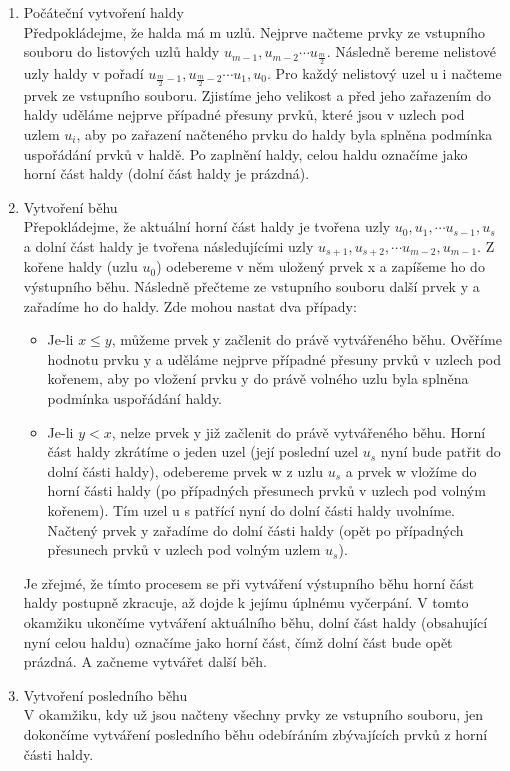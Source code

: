 \documentclass[10pt,a4paper]{article}
\begin{document}
\begin{enumerate}
	\item Počáteční vytvoření haldy \\
	Předpokládejme, že halda má m uzlů. Nejprve načteme prvky ze vstupního souboru do listových uzlů haldy $u_{m-1}, u_{m-2} \cdots u_{\frac{m}{2}}$. Následně bereme nelistové uzly haldy v pořadí $u_{\frac{m}{2}-1}, u_{\frac{m}{2}-2} \cdots u_1, u_0$. Pro každý nelistový uzel u i načteme prvek ze vstupního souboru. Zjistíme jeho velikost a před jeho zařazením do haldy uděláme nejprve případné přesuny prvků, které jsou v uzlech pod uzlem $u_i$, aby po zařazení načteného prvku do haldy byla splněna podmínka uspořádání prvků v haldě. Po zaplnění haldy, celou haldu označíme jako horní část haldy (dolní část haldy je prázdná).
	\item Vytvoření běhu \\
	Přepokládejme, že aktuální horní část haldy je tvořena uzly $u_0, u_1, \cdots u_{s-1}, u_s$ a dolní část haldy je tvořena následujícími uzly $u_{s+1}, u_{s+2}, \cdots u_{m-2}, u_{m-1}$. Z kořene haldy (uzlu $u_0$) odebereme v něm uložený prvek x a zapíšeme ho do výstupního běhu. Následně přečteme ze vstupního souboru další prvek y a zařadíme ho do haldy. Zde mohou nastat dva případy:
	\begin{itemize}
		\item Je-li $x \leq y$, můžeme prvek y začlenit do právě vytvářeného běhu. Ověříme hodnotu prvku y a uděláme nejprve případné přesuny prvků v uzlech pod kořenem, aby po vložení prvku y do právě volného uzlu byla splněna podmínka uspořádání haldy.
		\item Je-li $y<x$, nelze prvek y již začlenit do právě vytvářeného běhu. Horní část haldy zkrátíme o jeden uzel (její poslední uzel $u_s$ nyní bude patřit do dolní části haldy), odebereme prvek w z uzlu $u_s$ a prvek w vložíme do horní části haldy (po případných přesunech prvků v uzlech pod volným kořenem). Tím uzel u s patřící nyní do dolní části haldy uvolníme. Načtený prvek y zařadíme do dolní části haldy (opět po případných přesunech prvků v uzlech pod volným uzlem $u_s$).
	\end{itemize}
	Je zřejmé, že tímto procesem se při vytváření výstupního běhu horní část haldy postupně zkracuje, až dojde k jejímu úplnému vyčerpání. V tomto okamžiku ukončíme vytváření aktuálního běhu, dolní část haldy (obsahující nyní celou haldu) označíme jako horní část, čímž dolní část bude opět prázdná. A začneme vytvářet další běh.
	\item Vytvoření posledního běhu \\
	V okamžiku, kdy už jsou načteny všechny prvky ze vstupního souboru, jen dokončíme vytváření posledního běhu odebíráním zbývajících prvků z horní části haldy.
\end{enumerate}
\end{document}
